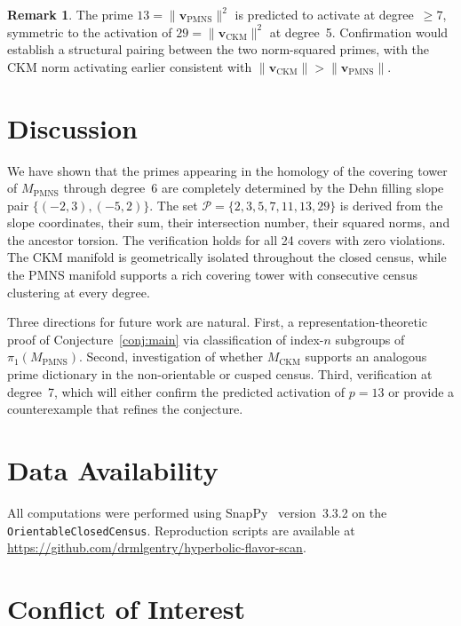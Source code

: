\documentclass[12pt]{article}
\theoremstyle{definition}
\newtheorem{remark}[theorem]{Remark}
\begin{document}
\begin{remark}
The prime $13 = \|\mathbf{v}_{\mathrm{PMNS}}\|^2$ is predicted to
activate at degree~$\geq 7$, symmetric to the activation of
$29 = \|\mathbf{v}_{\mathrm{CKM}}\|^2$ at degree~5. Confirmation would
establish a structural pairing between the two norm-squared primes,
with the CKM norm activating earlier consistent with
$\|\mathbf{v}_{\mathrm{CKM}}\| > \|\mathbf{v}_{\mathrm{PMNS}}\|$.
\end{remark}

\section{Discussion}
\label{sec:conclusion}

We have shown that the primes appearing in the homology of the covering
tower of $M_{\mathrm{PMNS}}$ through degree~6 are completely determined
by the Dehn filling slope pair $\{(-2,3),(-5,2)\}$. The set
$\mathcal{P} = \{2,3,5,7,11,13,29\}$ is derived from the slope
coordinates, their sum, their intersection number, their squared norms,
and the ancestor torsion. The verification holds for all 24 covers with
zero violations. The CKM manifold is geometrically isolated throughout
the closed census, while the PMNS manifold supports a rich covering
tower with consecutive census clustering at every degree.

Three directions for future work are natural. First, a
representation-theoretic proof of Conjecture~\ref{conj:main} via
classification of index-$n$ subgroups of $\pi_1(M_{\mathrm{PMNS}})$.
Second, investigation of whether $M_{\mathrm{CKM}}$ supports an
analogous prime dictionary in the non-orientable or cusped census.
Third, verification at degree~7, which will either confirm the predicted
activation of $p = 13$ or provide a counterexample that refines the
conjecture.

\section*{Data Availability}

All computations were performed using SnapPy~\cite{SnapPy} version~3.3.2 on the \texttt{OrientableClosedCensus}. Reproduction scripts are
available at
\url{https://github.com/drmlgentry/hyperbolic-flavor-scan}.

\section*{Conflict of Interest}
\end{document}
